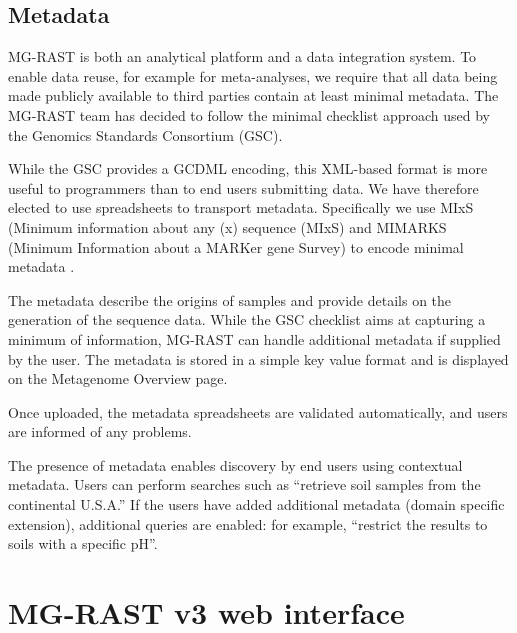 \documentclass[12pt,fullpage]{report}
\begin{document}
\section{Metadata}
\label{section:metadata}

MG-RAST is both an analytical platform and a data integration system. To enable data reuse, for example for meta-analyses, we require that all data being made publicly available to third parties contain at least minimal metadata. The MG-RAST team has decided to follow the minimal checklist approach used by the Genomics Standards Consortium (GSC)\cite{GSC}.

While the GSC provides a GCDML \cite{GCDML} encoding, this XML-based format is more useful to programmers than to end users submitting data.
We have therefore elected to use spreadsheets to transport metadata. Specifically we use MIxS (Minimum information about any (x) sequence (MIxS) and MIMARKS (Minimum Information about a MARKer gene Survey) to encode minimal metadata \cite{MIENS}.

The metadata describe the origins of samples and provide details on the generation of the sequence data. While the GSC checklist aims at capturing a minimum of information, MG-RAST can handle additional metadata if supplied by the user. The metadata is stored in a simple key value format and is displayed on the Metagenome Overview page.

Once uploaded, the metadata spreadsheets are validated automatically, and users are informed of any problems.

The presence of metadata enables discovery by end users using contextual metadata. Users can perform searches such as ``retrieve soil samples from the continental U.S.A.'' If the users have added additional metadata (domain specific extension), additional queries are enabled: for example, ``restrict the results to soils with a specific pH''.
\chapter{MG-RAST v3 web interface}
\end{document}
